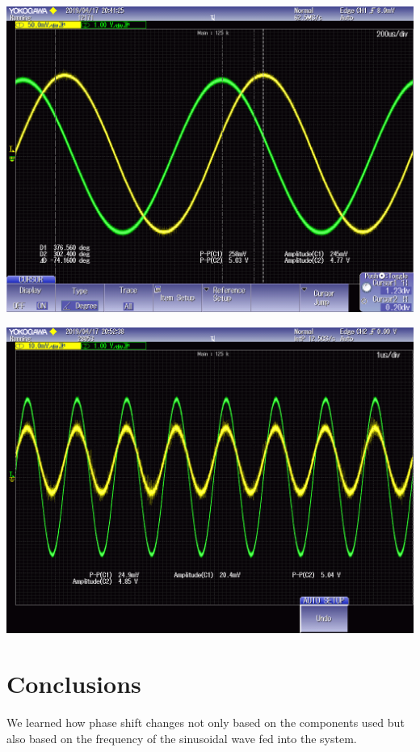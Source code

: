 \documentclass[journal]{IEEEtran}
\begin{document}
\begingroup
    \centering
    \medskip
    \includegraphics[width=\columnwidth]{images/lab8_002.png}
    \label{fig:phaseshift1}
    \medskip
\endgroup

\begingroup
    \centering
    \medskip
    \includegraphics[width=\columnwidth]{images/lab8_012.png}
    \label{fig:phaseshift40}
    \medskip
\endgroup

\section{Conclusions}
\noindent We learned how phase shift changes not only based on the components used but also based on the frequency of the sinusoidal wave fed into the system.

\printbibliography
\end{document}
